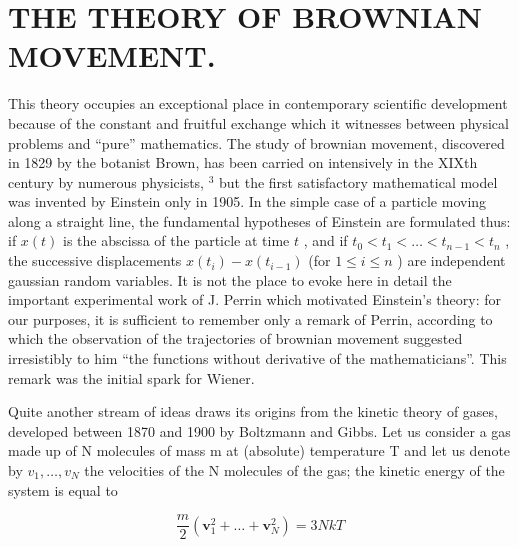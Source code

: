 \section*{THE THEORY OF BROWNIAN MOVEMENT.}
{}

This theory occupies an exceptional place in contemporary scientific development because of the constant and fruitful exchange which it witnesses between physical problems and ``pure'' mathematics. The study of brownian movement, discovered in 1829 by the botanist Brown, has been carried on intensively in the XIXth century by numerous physicists, \(^{3}\) but the first satisfactory mathematical model was invented by Einstein only in 1905. In the simple case of a particle moving along a straight line, the fundamental hypotheses of Einstein are formulated thus: if \(x(t)\) is the abscissa of the particle at time \(t\) , and if \(t_0 < t_1 < \ldots < t_{n-1} < t_n\) , the successive displacements \(x(t_i) - x(t_{i-1})\) (for \(1 \leq i \leq n\) ) are independent gaussian random variables. It is not the place to evoke here in detail the important experimental work of J. Perrin which motivated Einstein's theory: for our purposes, it is sufficient to remember only a remark of Perrin, according to which the observation of the trajectories of brownian movement suggested irresistibly to him ``the functions without derivative of the mathematicians''. This remark was the initial spark for Wiener.

Quite another stream of ideas draws its origins from the kinetic theory of gases, developed between 1870 and 1900 by Boltzmann and Gibbs. Let us consider a gas made up of N molecules of mass m at (absolute) temperature T and let us denote by \(v_{1}, \ldots, v_{N}\) the velocities of the N molecules of the gas; the kinetic energy of the system is equal to

\[
\frac {m}{2} (\mathbf {v} _ {1} ^ {2} + \dots + \mathbf {v} _ {N} ^ {2}) = 3 N k T\tag{24.1}
\]

